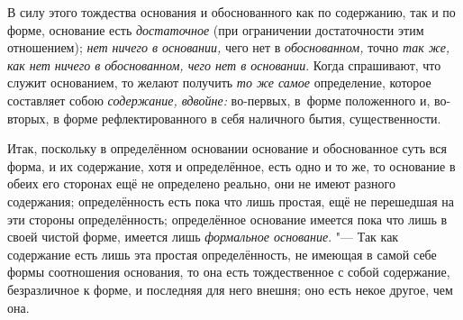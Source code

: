 В силу этого тождества основания и обоснованного как по содержанию, так и по
форме, основание есть {\em достаточное} (при ограничении достаточности этим
отношением); {\em нет ничего в основании,} чего нет в {\em обоснованном,} точно
{\em так же, как нет ничего в обоснованном, чего нет в основании}. Когда
спрашивают, что служит основанием, то желают получить {\em то же самое}
определение, которое составляет собою {\em содержание, вдвойне:} во-первых,
в~форме положенного и, во-вторых, в форме рефлектированного в себя наличного
бытия, существенности.

Итак, поскольку в определённом основании основание и обоснованное суть вся
форма, и их содержание, хотя и определённое, есть одно и то же, то основание в
обеих его сторонах ещё не определено реально, они не имеют разного содержания;
определённость есть пока что лишь простая, ещё не перешедшая на эти стороны
определённость; определённое основание имеется пока что лишь в своей чистой
форме, имеется лишь {\em формальное основание}. "--- Так как содержание есть
лишь эта простая определённость, не имеющая в самой себе формы соотношения
основания, то она есть тождественное с собой содержание, безразличное к форме,
и последняя для него внешня; оно есть некое другое, чем она.


